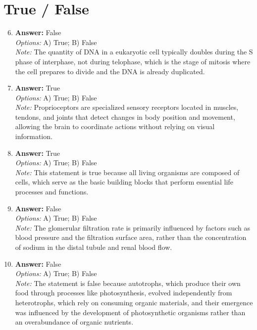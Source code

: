 \documentclass[12pt]{article}
\begin{document}
\section*{True / False}
\begin{enumerate}[label=\arabic*.]
\setcounter{enumi}{5}
\item \textbf{Answer:} False
\\ \textit{Options:} A) True; B) False
\\ \textit{Note:} The quantity of DNA in a eukaryotic cell typically doubles during the S phase of interphase, not during telophase, which is the stage of mitosis where the cell prepares to divide and the DNA is already duplicated.
\item \textbf{Answer:} True
\\ \textit{Options:} A) True; B) False
\\ \textit{Note:} Proprioceptors are specialized sensory receptors located in muscles, tendons, and joints that detect changes in body position and movement, allowing the brain to coordinate actions without relying on visual information.
\item \textbf{Answer:} True
\\ \textit{Options:} A) True; B) False
\\ \textit{Note:} This statement is true because all living organisms are composed of cells, which serve as the basic building blocks that perform essential life processes and functions.
\item \textbf{Answer:} False
\\ \textit{Options:} A) True; B) False
\\ \textit{Note:} The glomerular filtration rate is primarily influenced by factors such as blood pressure and the filtration surface area, rather than the concentration of sodium in the distal tubule and renal blood flow.
\item \textbf{Answer:} False
\\ \textit{Options:} A) True; B) False
\\ \textit{Note:} The statement is false because autotrophs, which produce their own food through processes like photosynthesis, evolved independently from heterotrophs, which rely on consuming organic materials, and their emergence was influenced by the development of photosynthetic organisms rather than an overabundance of organic nutrients.
\end{enumerate}
\end{document}
